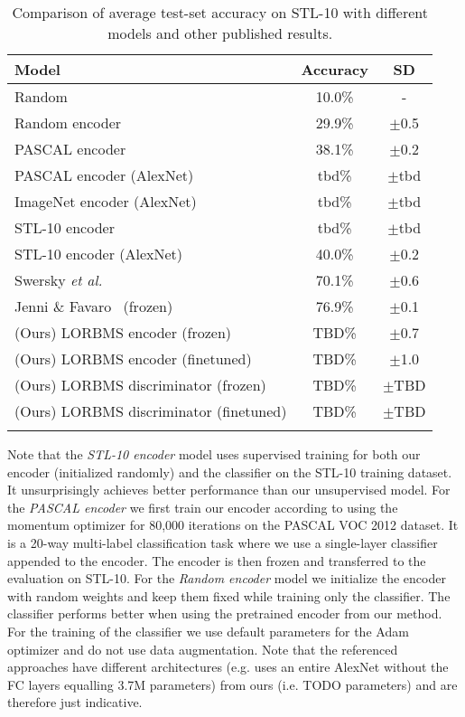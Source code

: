 \documentclass[12pt,a4paper]{article}
\begin{document}
\begin{table}[ht!]
\centering
\begin{tabular}{l|c|c}
\Xhline{0.8pt}
\textbf{Model} & \textbf{Accuracy} & \textbf{SD} \\
\hline
Random & 10.0\% & - \\
Random encoder & 29.9\% & $\pm$0.5 \\ %
PASCAL encoder & 38.1\% & $\pm$0.2  \\ %
PASCAL encoder (AlexNet) & tbd\% & $\pm$tbd  \\
ImageNet encoder (AlexNet) & tbd\% & $\pm$tbd  \\
STL-10 encoder & tbd\% & $\pm$tbd \\ %
STL-10 encoder (AlexNet) & 40.0\% & $\pm$0.2 \\ %
\hline
Swersky \textit{et al.}~\cite{Stl10TlExp2Comp} & 70.1\% & $\pm$0.6 \\
Jenni \& Favaro~\cite{SpotArtifacts} (frozen) & 76.9\% & $\pm$0.1 \\
\hline
(Ours) LORBMS encoder (frozen) & TBD\%  & $\pm$0.7  \\
(Ours) LORBMS encoder (finetuned) & TBD\% & $\pm$1.0  \\
(Ours) LORBMS discriminator (frozen) & TBD\%  & $\pm$TBD  \\
(Ours) LORBMS discriminator (finetuned) & TBD\%  & $\pm$TBD  \\
\Xhline{0.8pt}
\end{tabular}
\caption{Comparison of average test-set accuracy on STL-10 with different models and other published results.} \label{tab:comparison_stl10}
\end{table}
Note that the \textit{STL-10 encoder} model uses supervised training for both our encoder (initialized randomly) and the classifier on the STL-10 training dataset. It unsurprisingly achieves better performance than our unsupervised model. For the \textit{PASCAL encoder} we first train our encoder according to \cite{PascalVocTraining} using the momentum optimizer for 80,000 iterations on the PASCAL VOC 2012 dataset. It is a 20-way multi-label classification task where we use a single-layer classifier appended to the encoder. The encoder is then frozen and transferred to the evaluation on STL-10. For the \textit{Random encoder} model we initialize the encoder with random weights and keep them fixed while training only the classifier. The classifier performs better when using the pretrained encoder from our method. For the training of the classifier we use default parameters for the Adam optimizer and do not use data augmentation. Note that the referenced approaches have different architectures (e.g. \cite{SpotArtifacts} uses an entire AlexNet without the FC layers equalling 3.7M parameters) from ours (i.e. TODO parameters) and are therefore just indicative.
\end{document}

